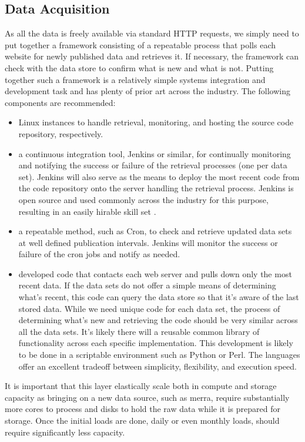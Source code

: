 \subsection{Data Acquisition}
As all the data is freely available via standard HTTP requests, we simply need to put together a framework consisting of a repeatable process that polls each website for newly published data and retrieves it. If necessary, the framework can check with the data store to confirm what is new and what is not. Putting together such a framework is a relatively simple systems integration and development task and has plenty of prior art across the industry. The following components are recommended:
\begin{itemize}
	\item Linux instances to handle retrieval, monitoring, and hosting the source code repository, respectively.
	\item a continuous integration tool, Jenkins or similar, for continually monitoring and notifying the success or failure of the retrieval processes (one per data set). Jenkins will also serve as the means to deploy the most recent code from the code repository onto the server handling the retrieval process. Jenkins is open source and used commonly across the industry for this purpose, resulting in an easily hirable skill set \cite{jenkins}.
	\item a repeatable method, such as Cron, to check and retrieve updated data sets at well defined publication intervals. Jenkins will monitor the success or failure of the cron jobs and notify as needed.
	\item developed code that contacts each web server and pulls down only the most recent data. If the data sets do not offer a simple means of determining what's recent, this code can query the data store so that it's aware of the last stored data. While we need unique code for each data set, the process of determining what's new and retrieving the code should be very similar across all the data sets. It's likely there will a reusable common library of functionality across each specific implementation. This development is likely to be done in a scriptable environment such as Python or Perl. The languages offer an excellent tradeoff between simplicity, flexibility, and execution speed.
\end{itemize}
It is important that this layer elastically scale both in compute and storage capacity as bringing on a new data source, such as \gls{merra}, require substantially more cores to process and disks to hold the raw data while it is prepared for storage. Once the initial loads are done, daily or even monthly loads, should require significantly less capacity.
